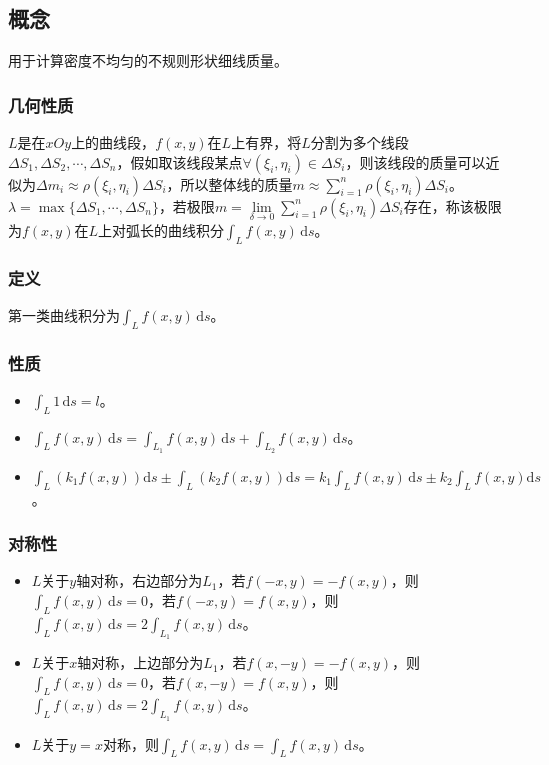\subsection{概念}

用于计算密度不均匀的不规则形状细线质量。

\subsubsection{几何性质}

$L$是在$xOy$上的曲线段，$f(x,y)$在$L$上有界，将$L$分割为多个线段$\Delta S_1,\Delta S_2,\cdots,\Delta S_n$，假如取该线段某点$\forall(\xi_i,\eta_i)\in\Delta S_i$，则该线段的质量可以近似为$\Delta m_i\approx\rho(\xi_i,\eta_i)\Delta S_i$，所以整体线的质量$m\approx\sum\limits_{i=1}^n\rho(\xi_i,\eta_i)\Delta S_i$。$\lambda=\max\{\Delta S_1,\cdots,\Delta S_n\}$，若极限$m=\lim\limits_{\delta\to0}\sum\limits_{i=1}^n\rho(\xi_i,\eta_i)\Delta S_i$存在，称该极限为$f(x,y)$在$L$上对弧长的曲线积分$\int_Lf(x,y)\,\textrm{d}s$。

\subsubsection{定义}

第一类曲线积分为$\int_Lf(x,y)\,\textrm{d}s$。

\subsubsection{性质}

\begin{itemize}
    \item $\int_L1\,\textrm{d}s=l$。
    \item $\int_Lf(x,y)\,\textrm{d}s=\int_{L_1}f(x,y)\,\textrm{d}s+\int_{L_2}f(x,y)\,\textrm{d}s$。
    \item $\int_L(k_1f(x,y))\textrm{d}s\pm\int_L(k_2f(x,y))\textrm{d}s=k_1\int_Lf(x,y)\,\textrm{d}s\pm k_2\int_Lf(x,y)\textrm{d}s$。
\end{itemize}

\subsubsection{对称性}

\begin{itemize}
    \item $L$关于$y$轴对称，右边部分为$L_1$，若$f(-x,y)=-f(x,y)$，则$\int_Lf(x,y)\,\textrm{d}s=0$，若$f(-x,y)=f(x,y)$，则$\int_Lf(x,y)\,\textrm{d}s=2\int_{L_1}f(x,y)\,\textrm{d}s$。
    \item $L$关于$x$轴对称，上边部分为$L_1$，若$f(x,-y)=-f(x,y)$，则$\int_Lf(x,y)\,\textrm{d}s=0$，若$f(x,-y)=f(x,y)$，则$\int_Lf(x,y)\,\textrm{d}s=2\int_{L_1}f(x,y)\,\textrm{d}s$。
    \item $L$关于$y=x$对称，则$\int_Lf(x,y)\,\textrm{d}s=\int_Lf(x,y)\,\textrm{d}s$。
\end{itemize}

